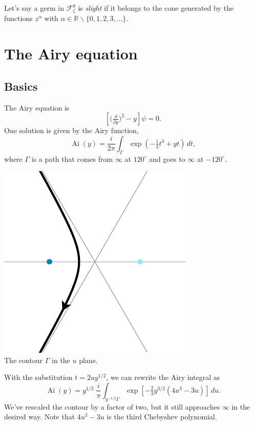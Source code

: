 \documentclass{article}
\theoremstyle{plain}
\newcommand{\R}{\mathbb{R}}
\DeclareMathOperator{\Ai}{Ai}
\begin{document}
Let's say a germ in $\mathcal{F}_\zeta^\theta$ is {\em slight} if it belongs to the cone generated by the functions $z^\alpha$ with $\alpha \in \R \smallsetminus \{0, 1, 2, 3, \ldots\}$.
\color{black}
\section{The Airy equation}
\subsection{Basics}
The Airy equation is
\begin{equation}\label{eqn:airy}
\left[\big(\tfrac{\partial}{\partial y}\big)^2 - y\right] \psi = 0.
\end{equation}
One solution is given by the Airy function,
\[ \Ai(y) = \frac{i}{2\pi} \int_{\Gamma} \exp\left(-\tfrac{1}{3}t^3 + yt\right)\,dt, \]
where $\Gamma$ is a path that comes from $\infty$ at $120^\circ$ and goes to $\infty$ at $-120^\circ$.
\begin{center}
\includegraphics{figures/u_contour_3.pdf} \\[1em]
{\small The contour $\Gamma$ in the $u$ plane.}
\end{center}
With the substitution $t = 2uy^{1/2}$, we can rewrite the Airy integral as
\[ \Ai(y) = y^{1/2}\;\frac{i}{\pi} \int_{y^{-1/2} \Gamma} \exp\left[-\tfrac{2}{3}y^{3/2} \left(4u^3 - 3u\right)\right]\,du. \]
We've rescaled the contour by a factor of two, but it still approaches $\infty$ in the desired way. Note that $4u^3 - 3u$ is the third Chebyshev polynomial.
\end{document}
